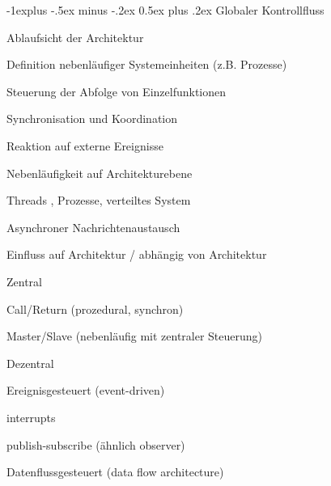 \documentclass[a4paper]{article}
\makeatletter
\renewcommand{\subsection}{\@startsection{subsection}{2}{0mm}%
                                {-1explus -.5ex minus -.2ex}%
                                {0.5ex plus .2ex}%
                                {\normalfont\normalsize\bfseries}}
\makeatother
\begin{document}
\begin{multicols}{3}
  \subsection{Globaler Kontrollfluss}
  \begin{itemize*}
    \item Ablaufsicht der Architektur
    \begin{itemize*}
      \item Definition nebenläufiger Systemeinheiten (z.B. Prozesse)
      \item Steuerung der Abfolge von Einzelfunktionen
      \item Synchronisation und Koordination
      \item Reaktion auf externe Ereignisse
    \end{itemize*}
    \item Nebenläufigkeit auf Architekturebene
    \begin{itemize*}
      \item Threads , Prozesse, verteiltes System
      \item Asynchroner Nachrichtenaustausch
    \end{itemize*}
    \item Einfluss auf Architektur / abhängig von Architektur
    \begin{itemize*}
      \item Zentral
      \begin{itemize*}
        \item Call/Return (prozedural, synchron)
        \item Master/Slave (nebenläufig mit zentraler Steuerung)
      \end{itemize*}
      \item Dezentral
      \begin{itemize*}
        \item Ereignisgesteuert (event-driven)
        \item interrupts
        \item publish-subscribe (ähnlich observer)
        \item Datenflussgesteuert (data flow architecture)
      \end{itemize*}
    \end{itemize*}
  \end{itemize*}


\end{multicols}
\end{document}
